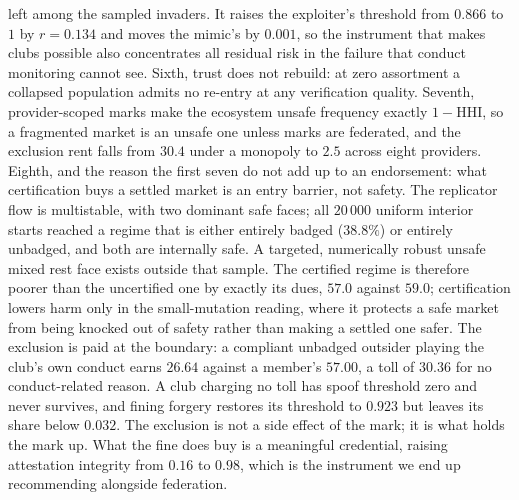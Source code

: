 left among the sampled invaders. It
raises the exploiter's threshold from $0.866$ to $1$ by $r = 0.134$ and moves
the mimic's by $0.001$, so the instrument that makes clubs possible also
concentrates all residual risk in the failure that conduct monitoring cannot
see. Sixth, trust does not rebuild: at zero assortment
a collapsed population admits no re-entry at any verification quality.
Seventh, provider-scoped marks make the ecosystem unsafe frequency exactly
$1 - \mathrm{HHI}$, so a fragmented market is an unsafe one unless marks are
federated, and the
exclusion rent falls from $30.4$ under a monopoly to $2.5$ across eight
providers. Eighth, and the reason the first seven do not add up to an
endorsement: what certification buys a settled market is an entry barrier, not
safety. The replicator flow is multistable, with two dominant safe faces; all
$20\,000$ uniform interior starts reached a regime that is either entirely
badged ($38.8\%$) or entirely unbadged, and both are internally safe. A
targeted, numerically robust unsafe mixed rest face exists outside that sample.
The certified regime is
therefore poorer than the uncertified one by exactly its dues, $57.0$ against
$59.0$; certification lowers harm only in the small-mutation reading, where it
protects a safe market from being knocked out of safety rather than making a
settled one safer. The exclusion is paid at the boundary: a compliant unbadged
outsider playing the club's own conduct earns $26.64$ against a member's
$57.00$, a toll of $30.36$ for no conduct-related reason. A club charging no
toll has spoof threshold zero and never survives, and fining forgery restores
its threshold to $0.923$ but leaves its share below $0.032$. The exclusion is
not a side effect of the mark; it is what holds the mark up. What the fine does
buy is a meaningful credential, raising attestation integrity from $0.16$ to
$0.98$, which is the instrument we end up recommending alongside federation.

